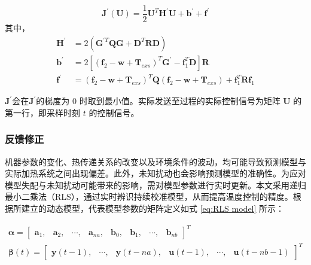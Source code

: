 \begin{equation}
    \boldsymbol{J}^{\prime}(\mathbf{U})=\frac{1}{2} \mathbf{U}^{T} \mathbf{H}^{\prime} \mathbf{U}+\mathbf{b}^{\prime}+\mathbf{f}^{\prime}
    \label{eq:cost function 3}
\end{equation}
其中，
\begin{equation}
    \begin{aligned}
        \mathbf{H}^{\prime} &= 2\left(\mathbf{G}^{\prime T} \mathbf{Q} \mathbf{G}+\mathbf{D}^{T} \mathbf{R} \mathbf{D}\right)\\
        \mathbf{b}^{\prime} &= 2\left[\left(\mathbf{f}_{2}-\mathbf{w}+\mathbf{T}_{exs}\right)^{T} \mathbf{G}^{\prime}-\mathbf{f}_{1}^{T} \mathbf{D}\right]\mathbf{R}\\
        \mathbf{f}^{\prime} &= \left(\mathbf{f}_{2} - \mathbf{w}+\mathbf{T}_{exs}\right)^{T} \mathbf{Q} \left(\mathbf{f}_{2}-\mathbf{w}+\mathbf{T}_{exs}\right) + \mathbf{f}_{1}^{T} \mathbf{R} \mathbf{f}_{1}
    \end{aligned}
\end{equation}\par

$\boldsymbol{J}^{\prime}$会在$\boldsymbol{J}^{\prime}$的梯度为 0 时取到最小值。实际发送至过程的实际控制信号为矩阵 $\mathbf{U}$ 的第一行，即采样时刻 $t$ 的控制信号。\par

\subsubsection{反馈修正}
机器参数的变化、热传递关系的改变以及环境条件的波动，均可能导致预测模型与实际加热系统之间出现偏差。此外，未知扰动也会影响预测模型的准确性。为应对模型失配与未知扰动可能带来的影响，需对模型参数进行实时更新。本文采用递归最小二乘法（RLS），通过实时辨识持续校准模型，从而提高温度控制的精度。根据所建立的动态模型，代表模型参数的矩阵定义如式 \ref{eq:RLS model} 所示：\par

\begin{equation}
    \begin{array}{c}
        \boldsymbol{\alpha} = \left[\begin{array}{cccccccc}
            \boldsymbol{a}_1,& \boldsymbol{a}_2,& \cdots,& \boldsymbol{a}_{na},& \boldsymbol{b}_0,& \boldsymbol{b}_1,& \cdots,& \boldsymbol{b}_{nb}
        \end{array}\right]^T \\
        \boldsymbol{\beta}(t) = \left[\begin{array}{cccccc}
            \boldsymbol{y}(t-1),& \cdots,& \boldsymbol{y}(t-na),& \boldsymbol{u}(t-1),& \cdots,& \boldsymbol{u}(t-nb-1)
        \end{array}\right]^T
    \end{array}    
    \label{eq:RLS model}
\end{equation}\par

